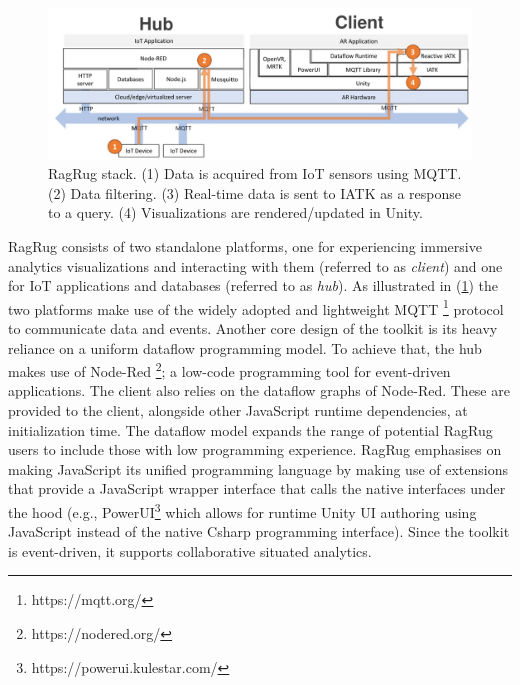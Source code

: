 \documentclass{vgtc}                          %
\begin{document}
\begin{figure}[tb]
	\centering
	\includegraphics[width=\columnwidth]{ragrug_stack}
	\caption[Caption for RagRug]{RagRug stack. (1) Data is acquired from IoT
		sensors using MQTT. (2) Data filtering. (3) Real-time data is sent to
		IATK as a response to a query. (4) Visualizations are
		rendered/updated in Unity.}
	\label{fig:ragrug_stack}
\end{figure}

\medskip

\noindent RagRug consists of two standalone platforms, one for experiencing immersive analytics
visualizations and interacting with them (referred to as \textit{client}) and one for IoT applications and
databases (referred to as \textit{hub}). As illustrated in (\ref{fig:ragrug_stack}) the two
platforms make use of the widely adopted and lightweight MQTT \footnote{https://mqtt.org/} protocol to
communicate data and events. Another core design of the toolkit is its heavy reliance on a uniform
dataflow programming model. To achieve that, the hub makes use of Node-Red \footnote{https://nodered.org/};
a low-code programming tool for event-driven applications. The client also relies on the dataflow graphs of
Node-Red. These are provided to the client, alongside other JavaScript runtime dependencies, at
initialization time. The dataflow model expands the range of potential RagRug users to include those with
low programming experience. RagRug emphasises on making JavaScript its unified programming language by making
use of extensions that provide a JavaScript wrapper interface that calls the native interfaces under the hood
(e.g., PowerUI\footnote{https://powerui.kulestar.com/} which allows for runtime Unity UI authoring using
JavaScript instead of the native Csharp programming interface). Since the toolkit is event-driven, it
supports collaborative situated analytics.


\medskip
\end{document}
